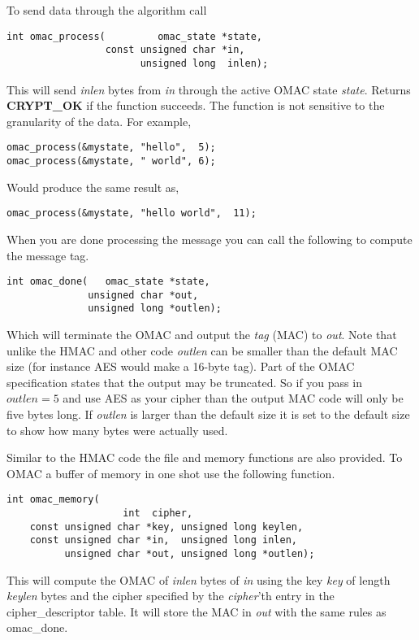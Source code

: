 \documentclass[synpaper]{book}
\begin{document}
To send data through the algorithm call
\begin{verbatim}
int omac_process(         omac_state *state, 
                 const unsigned char *in, 
                       unsigned long  inlen);
\end{verbatim}
This will send \textit{inlen} bytes from \textit{in} through the active OMAC state \textit{state}.  Returns \textbf{CRYPT\_OK} if the 
function succeeds.  The function is not sensitive to the granularity of the data.  For example,

\begin{verbatim}
omac_process(&mystate, "hello",  5);
omac_process(&mystate, " world", 6);
\end{verbatim}

Would produce the same result as,

\begin{verbatim}
omac_process(&mystate, "hello world",  11);
\end{verbatim}

When you are done processing the message you can call the following to compute the message tag.

\begin{verbatim}
int omac_done(   omac_state *state, 
              unsigned char *out, 
              unsigned long *outlen);
\end{verbatim}
Which will terminate the OMAC and output the \textit{tag} (MAC) to \textit{out}.  Note that unlike the HMAC and other code 
\textit{outlen} can be smaller than the default MAC size (for instance AES would make a 16-byte tag).  Part of the OMAC 
specification states that the output may be truncated.  So if you pass in $outlen = 5$ and use AES as your cipher than
the output MAC code will only be five bytes long.  If \textit{outlen} is larger than the default size it is set to the default
size to show how many bytes were actually used.

Similar to the HMAC code the file and memory functions are also provided.  To OMAC a buffer of memory in one shot use the 
following function.

\begin{verbatim}
int omac_memory(                
                    int  cipher, 
    const unsigned char *key, unsigned long keylen,
    const unsigned char *in,  unsigned long inlen,
          unsigned char *out, unsigned long *outlen);
\end{verbatim}
This will compute the OMAC of \textit{inlen} bytes of \textit{in} using the key \textit{key} of length \textit{keylen} bytes and the cipher
specified by the \textit{cipher}'th entry in the cipher\_descriptor table.  It will store the MAC in \textit{out} with the same
rules as omac\_done.
\end{document}
